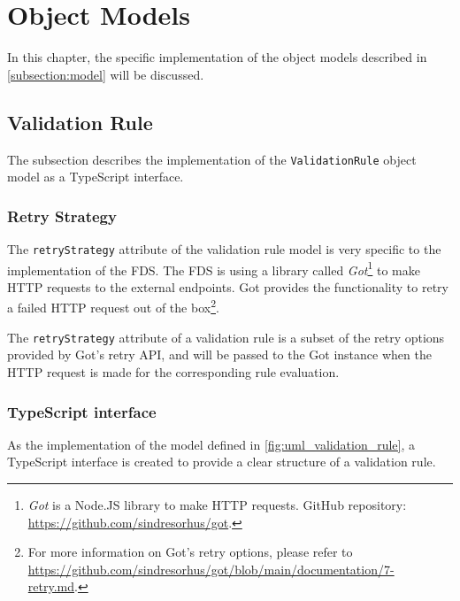 \section{Object Models}
  \label{impl_model}

In this chapter, the specific implementation of the object models described in \autoref{subsection:model} will be discussed. 

  \subsection{Validation Rule}
    \label{impl_model:rule}

    The subsection describes the implementation of the \verb;ValidationRule; object model as a TypeScript interface.

    \subsubsection{Retry Strategy}
      \label{impl_model:rule__retry}

      The \verb;retryStrategy; attribute of the validation rule model is very specific to the implementation of the FDS. The FDS is using a library called \emph{Got}\footnote{\emph{Got} is a Node.JS library to make HTTP requests. GitHub repository: \url{https://github.com/sindresorhus/got}.} to make HTTP requests to the external endpoints. Got provides the functionality to retry a failed HTTP request out of the box\footnote{For more information on Got's retry options, please refer to \url{https://github.com/sindresorhus/got/blob/main/documentation/7-retry.md}.}.

      The \verb;retryStrategy; attribute of a validation rule is a subset of the retry options provided by Got's retry API, and will be passed to the Got instance when the HTTP request is made for the corresponding rule evaluation. 

    \subsubsection{TypeScript interface}
      As the implementation of the model defined in \autoref{fig:uml_validation_rule}, a TypeScript interface is created to provide a clear structure of a validation rule.

